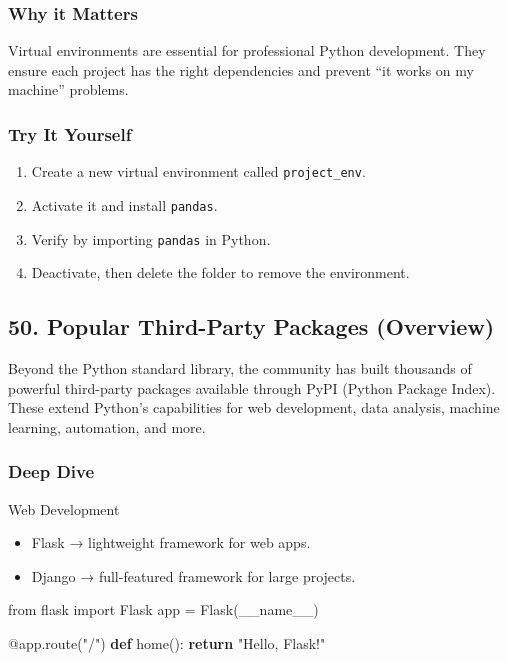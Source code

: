 \documentclass[
  letterpaper,
  DIV=11,
  numbers=noendperiod]{scrreprt}
\newenvironment{Shaded}{\begin{snugshade}}{\end{snugshade}}
\newcommand{\AttributeTok}[1]{\textcolor[rgb]{0.40,0.45,0.13}{#1}}
\newcommand{\ControlFlowTok}[1]{\textcolor[rgb]{0.00,0.23,0.31}{\textbf{#1}}}
\newcommand{\ImportTok}[1]{\textcolor[rgb]{0.00,0.46,0.62}{#1}}
\newcommand{\KeywordTok}[1]{\textcolor[rgb]{0.00,0.23,0.31}{\textbf{#1}}}
\newcommand{\NormalTok}[1]{\textcolor[rgb]{0.00,0.23,0.31}{#1}}
\newcommand{\OperatorTok}[1]{\textcolor[rgb]{0.37,0.37,0.37}{#1}}
\newcommand{\StringTok}[1]{\textcolor[rgb]{0.13,0.47,0.30}{#1}}
\newcommand{\VariableTok}[1]{\textcolor[rgb]{0.07,0.07,0.07}{#1}}
\providecommand{\tightlist}{%
  \setlength{\itemsep}{0pt}\setlength{\parskip}{0pt}}
\begin{document}
\subsubsection{Why it Matters}\label{why-it-matters-48}

Virtual environments are essential for professional Python development.
They ensure each project has the right dependencies and prevent ``it
works on my machine'' problems.

\subsubsection{Try It Yourself}\label{try-it-yourself-48}

\begin{enumerate}
\def\labelenumi{\arabic{enumi}.}
\tightlist
\item
  Create a new virtual environment called \texttt{project\_env}.
\item
  Activate it and install \texttt{pandas}.
\item
  Verify by importing \texttt{pandas} in Python.
\item
  Deactivate, then delete the folder to remove the environment.
\end{enumerate}

\subsection{50. Popular Third-Party Packages
(Overview)}\label{popular-third-party-packages-overview}

Beyond the Python standard library, the community has built thousands of
powerful third-party packages available through PyPI (Python Package
Index). These extend Python's capabilities for web development, data
analysis, machine learning, automation, and more.

\subsubsection{Deep Dive}\label{deep-dive-49}

Web Development

\begin{itemize}
\tightlist
\item
  Flask → lightweight framework for web apps.
\item
  Django → full-featured framework for large projects.
\end{itemize}

\begin{Shaded}
\begin{Highlighting}[]
\ImportTok{from}\NormalTok{ flask }\ImportTok{import}\NormalTok{ Flask}
\NormalTok{app }\OperatorTok{=}\NormalTok{ Flask(}\VariableTok{\_\_name\_\_}\NormalTok{)}

\AttributeTok{@app.route}\NormalTok{(}\StringTok{"/"}\NormalTok{)}
\KeywordTok{def}\NormalTok{ home():}
    \ControlFlowTok{return} \StringTok{"Hello, Flask!"}
\end{Highlighting}
\end{Shaded}
\end{document}
